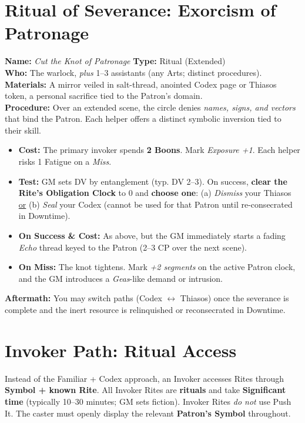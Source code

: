 \documentclass[12pt,twoside]{book}
\begin{document}
\section{Ritual of Severance: Exorcism of Patronage}
\label{subsec:exorcism}
\textbf{Name:} \emph{Cut the Knot of Patronage} \quad \textbf{Type:} Ritual (Extended) \\
\textbf{Who:} The warlock, \emph{plus} 1--3 assistants (any Arts; distinct procedures). \\
\textbf{Materials:} A mirror veiled in salt-thread, anointed Codex page or Thiasos token, a personal sacrifice tied to the Patron’s domain. \\
\textbf{Procedure:} Over an extended scene, the circle denies \emph{names, signs, and vectors} that bind the Patron. Each helper offers a distinct symbolic inversion tied to their skill.
\begin{itemize}
  \item \textbf{Cost:} The primary invoker spends \textbf{2 Boons}. Mark \emph{Exposure +1}. Each helper risks 1 Fatigue on a \emph{Miss}.
  \item \textbf{Test:} GM sets DV by entanglement (typ. DV 2–3). On success, \textbf{clear the Rite’s Obligation Clock} to 0 and \textbf{choose one}: (a) \emph{Dismiss} your Thiasos \underline{or} (b) \emph{Seal} your Codex (cannot be used for that Patron until re-consecrated in Downtime).
  \item \textbf{On Success \& Cost:} As above, but the GM immediately starts a fading \emph{Echo} thread keyed to the Patron (2–3 CP over the next scene).
  \item \textbf{On Miss:} The knot tightens. Mark \emph{+2 segments} on the active Patron clock, and the GM introduces a \emph{Geas}-like demand or intrusion.
\end{itemize}
\textbf{Aftermath:} You may switch paths (Codex $\leftrightarrow$ Thiasos) once the severance is complete and the inert resource is relinquished or reconsecrated in Downtime.


\section*{Invoker Path: Ritual Access}

Instead of the Familiar + Codex approach, an Invoker accesses Rites through \textbf{Symbol + known Rite}. All Invoker Rites are \textbf{rituals} and take \textbf{Significant time} (typically 10–30 minutes; GM sets fiction). Invoker Rites \emph{do not} use Push It. The caster must openly display the relevant \textbf{Patron’s Symbol} throughout.
\end{document}
